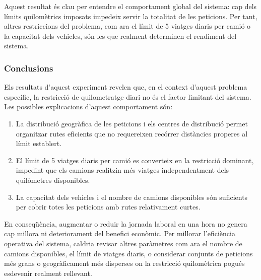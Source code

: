Aquest resultat és clau per entendre el comportament global del sistema: cap dels límits quilomètrics imposats impedeix servir la totalitat de les peticions. Per tant, altres restriccions del problema, com ara el límit de 5 viatges diaris per camió o la capacitat dels vehicles, són les que realment determinen el rendiment del sistema.

\vspace{0.5cm}


\subsubsection{Conclusions}

Els resultats d'aquest experiment revelen que, en el context d'aquest problema específic, la restricció de quilometratge diari no és el factor limitant del sistema. Les possibles explicacions d'aquest comportament són:

\begin{enumerate}
    \item La distribució geogràfica de les peticions i els centres de distribució permet organitzar rutes eficients que no requereixen recórrer distàncies properes al límit establert.
    \item El límit de 5 viatges diaris per camió es converteix en la restricció dominant, impedint que els camions realitzin més viatges independentment dels quilòmetres disponibles.
    \item La capacitat dels vehicles i el nombre de camions disponibles són suficients per cobrir totes les peticions amb rutes relativament curtes.
\end{enumerate}

En conseqüència, augmentar o reduir la jornada laboral en una hora no genera cap millora ni deteriorament del benefici econòmic. Per millorar l'eficiència operativa del sistema, caldria revisar altres paràmetres com ara el nombre de camions disponibles, el límit de viatges diaris, o considerar conjunts de peticions més grans o geogràficament més disperses on la restricció quilomètrica pogués esdevenir realment rellevant.